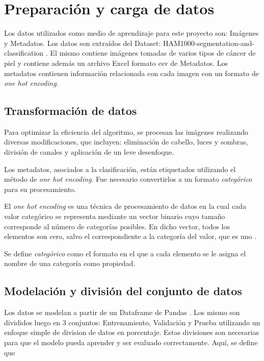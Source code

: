\section{Preparación y carga de datos}

Los datos utilizados como medio de aprendizaje para este proyecto son: Imágenes y Metadatos. Los datos son extraídos del Dataset: HAM1000-segmentation-and-classification  .
El mismo contiene imágenes tomadas de varios tipos de cáncer de piel y contiene además un archivo Excel formato csv de Metadatos. Los metadatos contienen información relacionada con cada imagen con un formato de \textit{one hot encoding}.

\subsection{Transformación de datos}

Para optimizar la eficiencia del algoritmo, se procesan las imágenes realizando diversas modificaciones, que incluyen: eliminación de cabello, luces y sombras, división de canales y aplicación de un leve desenfoque.

Los metadatos, asociados a la clasificación, están etiquetados utilizando el método de \textit{one hot encoding}. Fue necesario convertirlos a un formato \textit{categórico} para su procesamiento.

El \textit{one hot encoding} es una técnica de procesamiento de datos en la cual cada valor categórico se representa mediante un vector binario cuyo tamaño corresponde al número de categorías posibles. En dicho vector, todos los elementos son cero, salvo el correspondiente a la categoría del valor, que es uno . 

Se define \textit{categórico} como el formato en el que a cada elemento se le asigna el nombre de una categoría como propiedad.

\subsection{Modelación y división del conjunto de datos}

Los datos se modelan a partir de un Dataframe de Pandas  . Los mismo son divididos luego en 3 conjuntos: Entrenamiento, Validación y Prueba utilizando un enfoque simple de division de datos en porcentaje. Estas divisiones son necesarias para que el modelo pueda aprender y ser evaluado correctamente. Aquí, se define que

